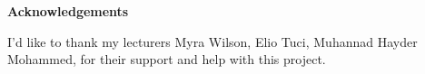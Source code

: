 \thispagestyle{empty}

\begin{center}
    {\LARGE\bf Acknowledgements}
\end{center}

I'd like to thank my lecturers Myra Wilson, Elio Tuci, Muhannad Hayder Mohammed, for their support and help with this project. 

